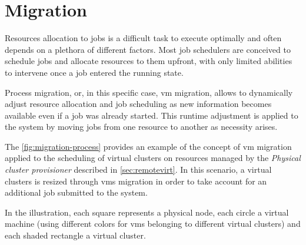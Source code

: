 \chapter{Migration}
\label{sec:migration}

Resources allocation to jobs is a difficult task to execute optimally and often depends on a plethora of different factors. Most job schedulers are conceived to schedule jobs and allocate resources to them upfront, with only limited abilities to intervene once a job entered the running state.

Process migration, or, in this specific case, \gls{vm} migration, allows to dynamically adjust resource allocation and job scheduling as new information becomes available even if a job was already started. This runtime adjustment is applied to the system by moving jobs from one resource to another as necessity arises.

The \autoref{fig:migration-process} provides an example of the concept of \gls{vm} migration applied to the scheduling of virtual clusters on resources managed by the \emph{Physical cluster provisioner} described in \autoref{sec:remotevirt}. In this scenario, a virtual clusters is resized through \glspl{vm} migration in order to take account for an additional job submitted to the system.

In the illustration, each square represents a physical node, each circle a virtual machine (using different colors for \glspl{vm} belonging to different virtual clusters) and each shaded rectangle a virtual cluster.

